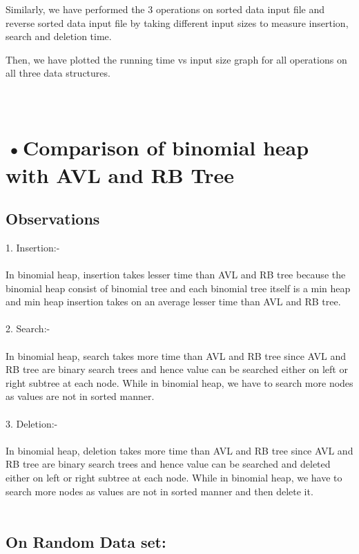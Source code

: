 \documentclass[10pt,a4paper]{article} ,
\begin{document}
Similarly, we have performed the 3 operations on sorted data input file and reverse sorted data input file by taking different input sizes to measure insertion, search and deletion time. 
		
	Then, we have plotted the running time vs input size graph for all operations on all three data structures.\\


\section*{\\•Comparison of binomial heap with AVL and RB Tree}

\subsection*{Observations}

1. Insertion:- \\ \\
	In binomial heap, insertion takes lesser time than AVL and RB tree because the binomial heap consist of binomial tree and each binomial tree itself is a min heap and min heap insertion takes on an average lesser time than AVL and RB tree.\\ \\
	
2. Search:- \\ \\
	In binomial heap, search takes more time than AVL and RB tree since AVL and RB tree are binary search trees and hence value can be searched either on left or right subtree at each node. While in binomial heap, we have to search more nodes as values are not in sorted manner. \\ \\

3. Deletion:- \\ \\
	In binomial heap, deletion takes more time than AVL and RB tree since AVL and RB tree are binary search trees and hence value can be searched and deleted either on left or right subtree at each node. While in binomial heap, we have to search more nodes as values are not in sorted manner and then delete it. \\ \\
	
\subsection*{On Random Data set:}
\end{document}
